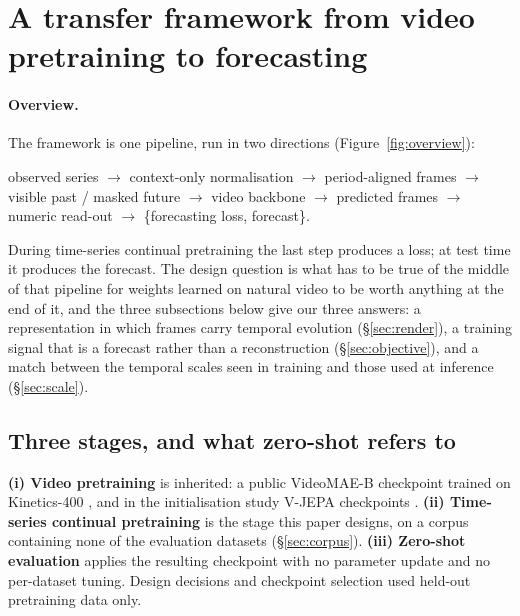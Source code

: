 \section{A transfer framework from video pretraining to forecasting}
\label{sec:method}



\paragraph{Overview.} The framework is one pipeline, run in two directions
(Figure~\ref{fig:overview}):
\begin{center}
\small
observed series $\rightarrow$ context-only normalisation $\rightarrow$ period-aligned frames
$\rightarrow$ visible past / masked future $\rightarrow$ video backbone $\rightarrow$ predicted
frames $\rightarrow$ numeric read-out $\rightarrow$ \{forecasting loss, forecast\}.
\end{center}
During time-series continual pretraining the last step produces a loss; at test time it produces the
forecast. The design question is what has to be true of the middle of that pipeline for weights
learned on natural video to be worth anything at the end of it, and the three subsections below give
our three answers: a representation in which frames carry temporal evolution
(\S\ref{sec:render}), a training signal that is a forecast rather than a reconstruction
(\S\ref{sec:objective}), and a match between the temporal scales seen in training and those used at
inference (\S\ref{sec:scale}).

\subsection{Three stages, and what zero-shot refers to}
\label{sec:stages}

\textbf{(i) Video pretraining} is inherited: a public VideoMAE-B checkpoint trained on Kinetics-400
\citep{videomae}, and in the initialisation study V-JEPA checkpoints \citep{vjepa2}.
\textbf{(ii) Time-series continual pretraining} is the stage this paper designs, on a corpus
containing none of the evaluation datasets (\S\ref{sec:corpus}). \textbf{(iii) Zero-shot
evaluation} applies the resulting checkpoint with no parameter update and no per-dataset tuning.
Design decisions and checkpoint selection used held-out pretraining data only.

